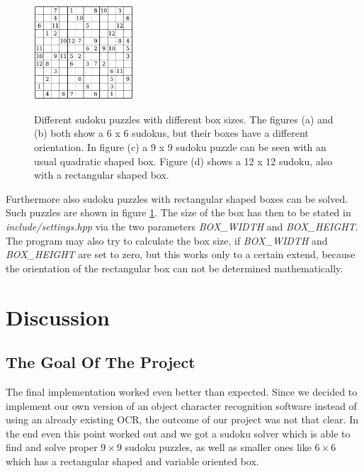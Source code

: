 \documentclass[
a4paper,     %
12pt         %
]{scrartcl}  %
\begin{document}
\begin{figure}[!bhp]
\begin{center}
\begin{minipage}[h]{3.8cm}
       \label{fig:9x9}
       \subcaption{}
     \end{minipage}
     \begin{minipage}[h]{3.9cm}
       \includegraphics[height=3.5cm]{imgs/solver_12x12.png}
       \label{fig:12x12}
       \subcaption{}
     \end{minipage}     
     \caption[Different sudoku puzzles with different box sizes]{\scriptsize{Different sudoku puzzles with different box sizes.
       The figures (a) and (b) both show a 6 x 6 sudokus, but their boxes have a different orientation. In figure (c) a 9 x 9
       sudoku puzzle can be seen with an usual quadratic shaped box. Figure (d) shows a 12 x 12 sudoku, also with a rectangular shaped box.}}
     \label{fig:boxshapes}
   \end{center}
\end{figure} 
Furthermore also sudoku puzzles with rectangular shaped boxes can be solved. Such puzzles are shown in figure \ref{fig:boxshapes}.
The size of the box has then to be stated in \emph{include/settings.hpp} via the two parameters \emph{BOX\_WIDTH} and \emph{BOX\_HEIGHT}. The 
program may also try to calculate the box size, if \emph{BOX\_WIDTH} and \emph{BOX\_HEIGHT} are set to zero, but this works only to a 
certain extend, because the orientation of the rectangular box can not be determined mathematically.

\section{Discussion}

\subsection{The Goal Of The Project}
The final implementation worked even better than expected. Since we decided to implement our own version of an object character recognition 
software instead of using an already existing OCR, the outcome of our project was not that clear. In the end even this point worked out and
we got a sudoku solver which is able to find and solve proper $9 \times 9$ sudoku puzzles, as well as smaller ones like 
$6 \times 6$ which has a rectangular shaped and variable oriented box.
\end{document}
